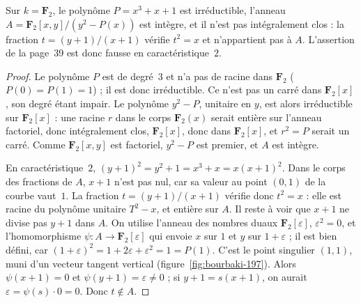 \begin{encadre}
\begin{contrexemple}
Sur $k = \mathbf F_2$, le polynôme $P = x^3 + x + 1$ est irréductible, l'anneau $A = \mathbf F_2[x, y]/(y^2 - P(x))$ est intègre, et il n'est pas intégralement clos : la fraction $t = (y + 1)/(x + 1)$ vérifie $t^2 = x$ et n'appartient pas à $A$. L'assertion de la page~39 est donc fausse en caractéristique~$2$.
\end{contrexemple}
\end{encadre}

\begin{proof}
Le polynôme $P$ est de degré~$3$ et n'a pas de racine dans $\mathbf F_2$ ($P(0) = P(1) = 1$) ; il est donc irréductible. Ce n'est pas un carré dans $\mathbf F_2[x]$, son degré étant impair. Le polynôme $y^2 - P$, unitaire en $y$, est alors irréductible sur $\mathbf F_2[x]$ : une racine $r$ dans le corps $\mathbf F_2(x)$ serait entière sur l'anneau factoriel, donc intégralement clos, $\mathbf F_2[x]$, donc dans $\mathbf F_2[x]$, et $r^2 = P$ serait un carré. Comme $\mathbf F_2[x, y]$ est factoriel, $y^2 - P$ est premier, et $A$ est intègre.

En caractéristique~$2$, $(y + 1)^2 = y^2 + 1 = x^3 + x = x(x + 1)^2$. Dans le corps des fractions de $A$, $x + 1$ n'est pas nul, car sa valeur au point $(0, 1)$ de la courbe vaut~$1$. La fraction $t = (y + 1)/(x + 1)$ vérifie donc $t^2 = x$ : elle est racine du polynôme unitaire $T^2 - x$, et entière sur $A$. Il reste à voir que $x + 1$ ne divise pas $y + 1$ dans $A$. On utilise l'anneau des nombres duaux $\mathbf F_2[\varepsilon]$, $\varepsilon^2 = 0$, et l'homomorphisme $\psi : A \to \mathbf F_2[\varepsilon]$ qui envoie $x$ sur $1$ et $y$ sur $1 + \varepsilon$ ; il est bien défini, car $(1 + \varepsilon)^2 = 1 + 2\varepsilon + \varepsilon^2 = 1 = P(1)$. C'est le point singulier $(1, 1)$, muni d'un vecteur tangent vertical (figure~\ref{fig:bourbaki-197}). Alors $\psi(x + 1) = 0$ et $\psi(y + 1) = \varepsilon \neq 0$ ; si $y + 1 = s(x + 1)$, on aurait $\varepsilon = \psi(s) \cdot 0 = 0$. Donc $t \notin A$.
\end{proof}

